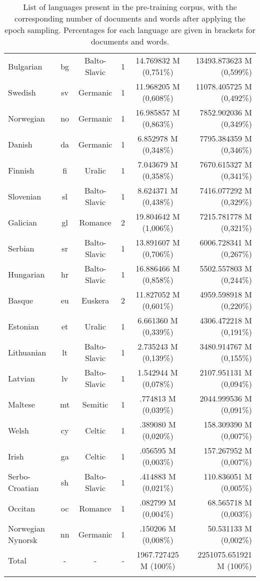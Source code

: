 \begin{table}[!ht]
{\begin{tabular}{lccccr}
Bulgarian & bg & Balto-Slavic & 1 & \num{14,769832} M (0,751\%) & \num{13493,873623} M (0,599\%) \\
Swedish & sv & Germanic & 1 & \num{11,968205} M (0,608\%) & \num{11078,405725} M (0,492\%) \\
Norwegian & no & Germanic & 1 & \num{16,985857} M (0,863\%) & \num{7852,902036} M (0,349\%) \\
Danish & da & Germanic & 1 & \num{6,852978} M (0,348\%) & \num{7795,384359} M (0,346\%) \\
Finnish & fi & Uralic & 1 & \num{7,043679} M (0,358\%) & \num{7670,615327} M (0,341\%) \\
Slovenian & sl & Balto-Slavic & 1 & \num{8,624371} M (0,438\%) & \num{7416,077292} M (0,329\%) \\
Galician & gl & Romance & 2 & \num{19,804642} M (1,006\%) & \num{7215,781778} M (0,321\%) \\
Serbian & sr & Balto-Slavic & 1 & \num{13,891607} M (0,706\%) & \num{6006,728341} M (0,267\%) \\
Hungarian & hr & Balto-Slavic & 1 & \num{16,886466} M (0,858\%) & \num{5502,557803} M (0,244\%) \\
Basque & eu & Euskera & 2 & \num{11,827052} M (0,601\%) & \num{4959,598918} M (0,220\%) \\
Estonian & et & Uralic & 1 & \num{6,661360} M (0,339\%) & \num{4306,472218} M (0,191\%) \\
Lithuanian & lt & Balto-Slavic & 1 & \num{2,735243} M (0,139\%) & \num{3480,914767} M (0,155\%) \\
Latvian & lv & Balto-Slavic & 1 & \num{1,542944} M (0,078\%) & \num{2107,951131} M (0,094\%) \\
Maltese & mt & Semitic & 1 & \num{,774813} M (0,039\%) & \num{2044,999536} M (0,091\%) \\
Welsh & cy & Celtic & 1 & \num{,389080} M (0,020\%) & \num{158,309390} M (0,007\%) \\
Irish & ga & Celtic & 1 & \num{,056595} M (0,003\%) & \num{157,267952} M (0,007\%) \\
Serbo-Croatian & sh & Balto-Slavic & 1 & \num{,414883} M (0,021\%) & \num{110,836051} M (0,005\%) \\
Occitan & oc & Romance & 1 & \num{,082799} M (0,004\%) & \num{68,565718} M (0,003\%) \\
Norwegian Nynorsk & nn & Germanic & 1 & \num{,150206} M (0,008\%) & \num{50,531133} M (0,002\%) \\ \hline
Total & - & - & - & \num{1967,727425} M (100\%) & \num{2251075,651921} M (100\%) \\
\bottomrule \\
\end{tabular}
}
\caption{List of languages present in the pre-training corpus, with the corresponding number of documents and words after applying the epoch sampling. Percentages for each language are given in brackets for documents and words.}
\label{tab:langs-corpus}
\end{table}
